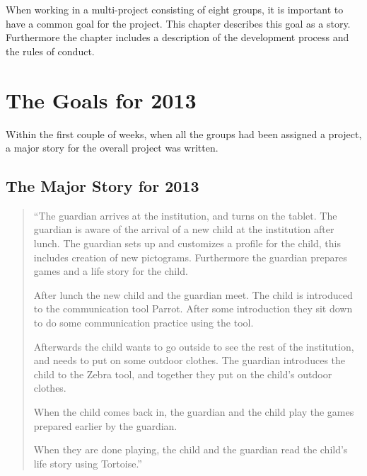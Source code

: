 When working in a multi-project consisting of eight groups, it is important to have a common goal for the project. This chapter describes this goal as a story. Furthermore the chapter includes a description of the development process and the rules of conduct.  %

\section{The Goals for 2013}
Within the first couple of weeks, when all the groups had been assigned a project, a major story for the overall project was written.

\subsection*{The Major Story for 2013}
\begin{quote}
``The guardian arrives at the institution, and turns on the tablet. The guardian is aware of the arrival of a new child at the institution after lunch.
The guardian sets up and customizes a profile for the child, this includes creation of new pictograms. Furthermore the guardian prepares games and a life story for the child.

After lunch the new child and the guardian meet. The child is introduced to the communication tool Parrot. After some introduction they sit down to do some communication practice using the tool.

Afterwards the child wants to go outside to see the rest of the institution, and needs to put on some outdoor clothes. The guardian introduces the child to the Zebra tool, and together they put on the child's outdoor clothes.

When the child comes back in, the guardian and the child play the games prepared earlier by the guardian.

When they are done playing, the child and the guardian read the child's life story using Tortoise.''
\end{quote}
